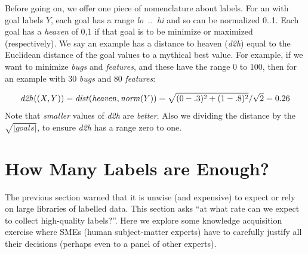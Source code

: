 Before going on, we   offer one piece of nomenclature about labels. For an {\eg} with goal labels $Y$, each  goal
has a range \mbox{ {\em lo .. hi}} and so
can be normalized 0..1. Each goal 
has a  {\em heaven}  of  0,1 if 
 that goal is to be  minimize or maximized  (respectively). We say an example has a distance to heaven ({\em d2h}) equal to the Euclidean distance of the goal values to a mythical best value. For example, if we want to minimize
\textit{ bugs} and \textit{features}, and these have the  range 0 to 100, then for an example with 30 \textit{bugs} and 80 \textit{features}:
 

{\small \begin{equation}\label{d2h}
{\scriptsize  
\mathit{d2h}((X,Y))  = \mathit{dist}(\mathit{heaven}, \mathit{norm}(Y)) =  \sqrt{ (0-.3)^2 +  (1-.8)^2}/\sqrt{2} = 0.26
}
\end{equation}}
Note that {\em smaller} values of \textit{d2h} are \textit{better}.
Also we dividing the distance by the $\sqrt{|\mathit{goals}|}$, to ensure    \textit{d2h} has a range zero to one. 



    
     
\section{How Many Labels are Enough?}
The previous section warned  that it is unwise (and expensive) to expect or rely on large libraries of labelled data. This section asks  ``at what rate can we expect to collect high-quality labels?''.
Here we explore 
 some knowledge acquisition exercise where SMEs (human subject-matter experts) have to carefully justify all their decisions (perhaps even to a panel of other experts).  
 
